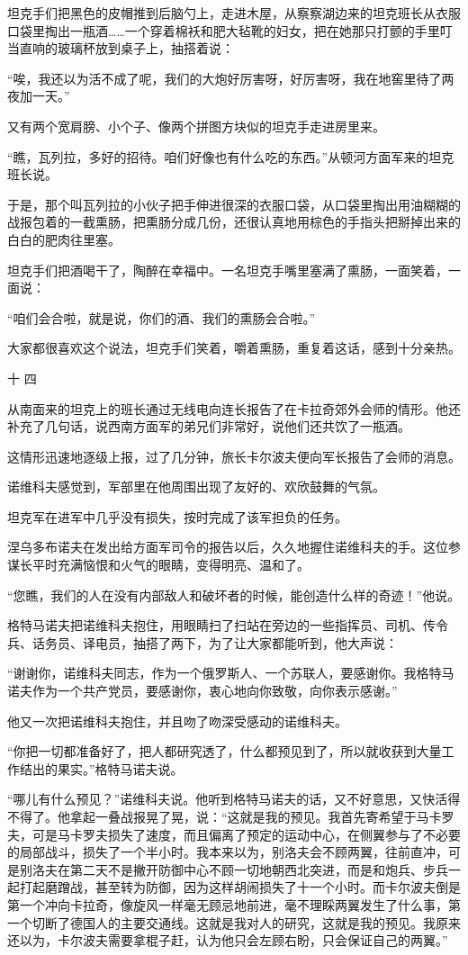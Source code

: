 坦克手们把黑色的皮帽推到后脑勺上，走进木屋，从察察湖边来的坦克班长从衣服口袋里掏出一瓶酒……一个穿着棉袄和肥大毡靴的妇女，把在她那只打颤的手里叮当直响的玻璃杯放到桌子上，抽搭着说：

“唉，我还以为活不成了呢，我们的大炮好厉害呀，好厉害呀，我在地窖里待了两夜加一天。”

又有两个宽肩膀、小个子、像两个拼图方块似的坦克手走进房里来。

“瞧，瓦列拉，多好的招待。咱们好像也有什么吃的东西。”从顿河方面军来的坦克班长说。

于是，那个叫瓦列拉的小伙子把手伸进很深的衣服口袋，从口袋里掏出用油糊糊的战报包着的一截熏肠，把熏肠分成几份，还很认真地用棕色的手指头把掰掉出来的白白的肥肉往里塞。

坦克手们把酒喝干了，陶醉在幸福中。一名坦克手嘴里塞满了熏肠，一面笑着，一面说：

“咱们会合啦，就是说，你们的酒、我们的熏肠会合啦。”

大家都很喜欢这个说法，坦克手们笑着，嚼着熏肠，重复着这话，感到十分亲热。

十 四

从南面来的坦克上的班长通过无线电向连长报告了在卡拉奇郊外会师的情形。他还补充了几句话，说西南方面军的弟兄们非常好，说他们还共饮了一瓶酒。

这情形迅速地逐级上报，过了几分钟，旅长卡尔波夫便向军长报告了会师的消息。

诺维科夫感觉到，军部里在他周围出现了友好的、欢欣鼓舞的气氛。

坦克军在进军中几乎没有损失，按时完成了该军担负的任务。

涅乌多布诺夫在发出给方面军司令的报告以后，久久地握住诺维科夫的手。这位参谋长平时充满恼恨和火气的眼睛，变得明亮、温和了。

“您瞧，我们的人在没有内部敌人和破坏者的时候，能创造什么样的奇迹！”他说。

格特马诺夫把诺维科夫抱住，用眼睛扫了扫站在旁边的一些指挥员、司机、传令兵、话务员、译电员，抽搭了两下，为了让大家都能听到，他大声说：

“谢谢你，诺维科夫同志，作为一个俄罗斯人、一个苏联人，要感谢你。我格特马诺夫作为一个共产党员，要感谢你，衷心地向你致敬，向你表示感谢。”

他又一次把诺维科夫抱住，并且吻了吻深受感动的诺维科夫。

“你把一切都准备好了，把人都研究透了，什么都预见到了，所以就收获到大量工作结出的果实。”格特马诺夫说。

“哪儿有什么预见？”诺维科夫说。他听到格特马诺夫的话，又不好意思，又快活得不得了。他拿起一叠战报晃了晃，说：“这就是我的预见。我首先寄希望于马卡罗夫，可是马卡罗夫损失了速度，而且偏离了预定的运动中心，在侧翼参与了不必要的局部战斗，损失了一个半小时。我本来以为，别洛夫会不顾两翼，往前直冲，可是别洛夫在第二天不是撇开防御中心不顾一切地朝西北突进，而是和炮兵、步兵一起打起磨蹭战，甚至转为防御，因为这样胡闹损失了十一个小时。而卡尔波夫倒是第一个冲向卡拉奇，像旋风一样毫无顾忌地前进，毫不理睬两翼发生了什么事，第一个切断了德国人的主要交通线。这就是我对人的研究，这就是我的预见。我原来还以为，卡尔波夫需要拿棍子赶，认为他只会左顾右盼，只会保证自己的两翼。”

